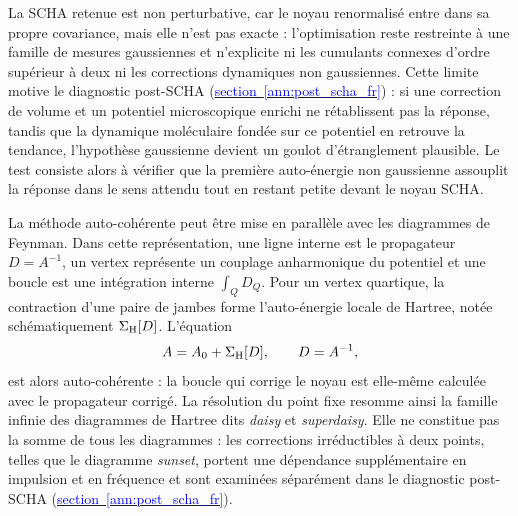 La SCHA retenue est non perturbative, car le noyau renormalisé entre dans sa
propre covariance, mais elle n'est pas exacte : l'optimisation reste restreinte
à une famille de mesures gaussiennes et n'explicite ni les cumulants connexes
d'ordre supérieur à deux ni les corrections dynamiques non gaussiennes. Cette
limite motive le diagnostic post-SCHA
(\hyperref[ann:post_scha_fr]{\textcolor{blue}{section~\ref*{ann:post_scha_fr}}}) :
si une correction de volume et un
potentiel microscopique enrichi ne rétablissent pas la réponse, tandis que la
dynamique moléculaire fondée sur ce potentiel en retrouve la tendance,
l'hypothèse gaussienne devient un goulot d'étranglement plausible. Le test
consiste alors à vérifier que la première auto-énergie non gaussienne assouplit
la réponse dans le sens attendu tout en restant petite devant le noyau SCHA.

La méthode auto-cohérente peut être mise en parallèle avec les diagrammes de
Feynman. Dans cette représentation, une ligne interne est le propagateur
$D=A^{-1}$, un vertex représente un couplage anharmonique du potentiel et une
boucle est une intégration interne $\int_QD_Q$. Pour un vertex quartique, la
contraction d'une paire de jambes forme l'auto-énergie locale de Hartree,
notée schématiquement $\Sigma_{\rm H}[D]$. L'équation
\begin{equation}
A=A_0+\Sigma_{\rm H}[D],
\qquad D=A^{-1},
\label{eq:core_hartree_diagrammatic_closure}
\end{equation}
est alors auto-cohérente : la boucle qui corrige le noyau est elle-même
calculée avec le propagateur corrigé. La résolution du point fixe resomme ainsi
la famille infinie des diagrammes de Hartree dits \emph{daisy} et
\emph{superdaisy}. Elle ne constitue pas la somme de tous les diagrammes : les
corrections irréductibles à deux points, telles que le diagramme \emph{sunset},
portent une dépendance supplémentaire en impulsion et en fréquence et sont
examinées séparément dans le diagnostic post-SCHA
(\hyperref[ann:post_scha_fr]{\textcolor{blue}{section~\ref*{ann:post_scha_fr}}}).

